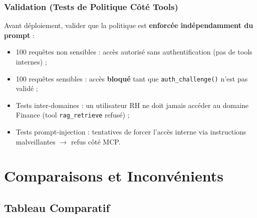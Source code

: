 \documentclass[12pt, a4paper]{report}
\begin{document}
\subsubsection{Validation (Tests de Politique Côté Tools)}

Avant déploiement, valider que la politique est \textbf{enforcée
indépendamment du prompt} :

\begin{itemize}
  \item 100 requêtes non sensibles : accès autorisé sans authentification
        (pas de tools internes) ;
  \item 100 requêtes sensibles : accès \textbf{bloqué} tant que
        \texttt{auth\_challenge()} n'est pas validé ;
  \item Tests inter-domaines : un utilisateur RH ne doit jamais accéder
        au domaine Finance (tool \texttt{rag\_retrieve} refusé) ;
  \item Tests prompt-injection : tentatives de forcer l'accès interne
        via instructions malveillantes $\rightarrow$ refus côté MCP.
\end{itemize}

\newpage

\section{Comparaisons et Inconvénients}

\subsection{Tableau Comparatif}
\end{document}
